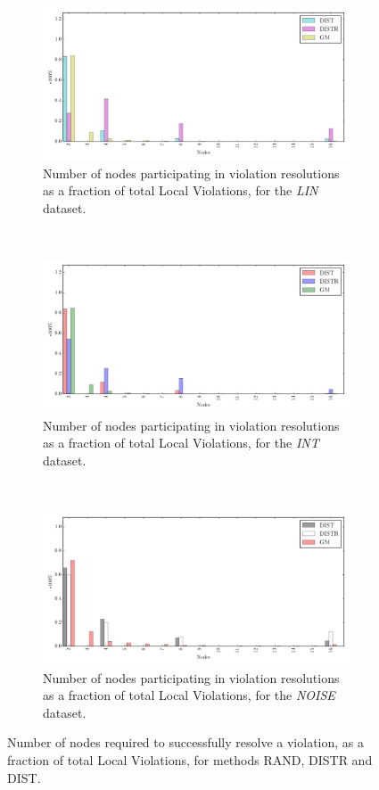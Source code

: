 \begin{figure}[!ht]\centering
\vspace{-0.5cm}
\begin{subfigure}{\textwidth}
	\centering
  \includegraphics[width=0.72\linewidth]{img/matchings_matchings_linear.pdf}
  \caption{Number of nodes participating in violation resolutions as a fraction of total Local Violations, for the \emph{LIN} dataset.}
\end{subfigure}\hfill\\[1.5em]
\begin{subfigure}{\textwidth}
\centering
  \includegraphics[width=0.72\linewidth]{img/matchings_matchings_interweaving.pdf}
  \caption{Number of nodes participating in violation resolutions as a fraction of total Local Violations, for the \emph{INT} dataset.}
\end{subfigure}\hfill\\[1.5em]
\begin{subfigure}{\textwidth}%
\centering
  \includegraphics[width=0.72\linewidth]{img/matchings_matchings_noisyinterweaving.pdf}
  \caption{Number of nodes participating in violation resolutions as a fraction of total Local Violations, for the \emph{NOISE} dataset.}
\end{subfigure}
\vspace{0.5cm}
\caption{Number of nodes required to successfully resolve a violation, as a fraction of total Local Violations, for methods RAND, DISTR and DIST.} \label{fig:matchingComp-matchings}
\end{figure}

